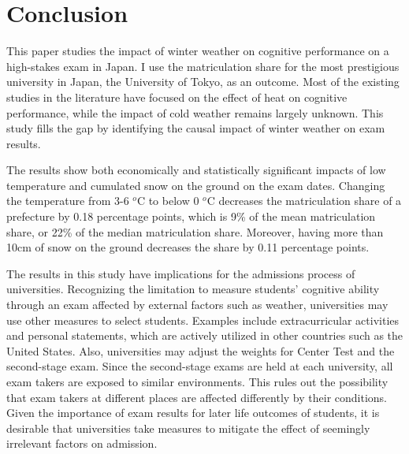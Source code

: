 \documentclass[12pt,letterpaper]{article}
\begin{document}
\section{Conclusion}\label{sec:conclusion}

This paper studies the impact of winter weather on cognitive performance on a high-stakes exam in Japan.
I use the matriculation share for the most prestigious university in Japan, the University of Tokyo, as an outcome.
Most of the existing studies in the literature have focused on the effect of heat on cognitive performance, while the impact of cold weather remains largely unknown.
This study fills the gap by identifying the causal impact of winter weather on exam results.

The results show both economically and statistically significant impacts of low temperature and cumulated snow on the ground on the exam dates.
Changing the temperature from 3-6 $^o$C to below 0 $^o$C decreases the matriculation share of a prefecture by 0.18 percentage points, which is 9\% of the mean matriculation share, or 22\% of the median matriculation share.
Moreover, having more than 10cm of snow on the ground decreases the share by 0.11 percentage points.

The results in this study have implications for the admissions process of universities.
Recognizing the limitation to measure students' cognitive ability through an exam affected by external factors such as weather, universities may use other measures to select students.
Examples include extracurricular activities and personal statements, which are actively utilized in other countries such as the United States.
Also, universities may adjust the weights for Center Test and the second-stage exam.
Since the second-stage exams are held at each university, all exam takers are exposed to similar environments.
This rules out the possibility that exam takers at different places are affected differently by their conditions.
Given the importance of exam results for later life outcomes of students, it is desirable that universities take measures to mitigate the effect of seemingly irrelevant factors on admission.

\clearpage


\end{document}
